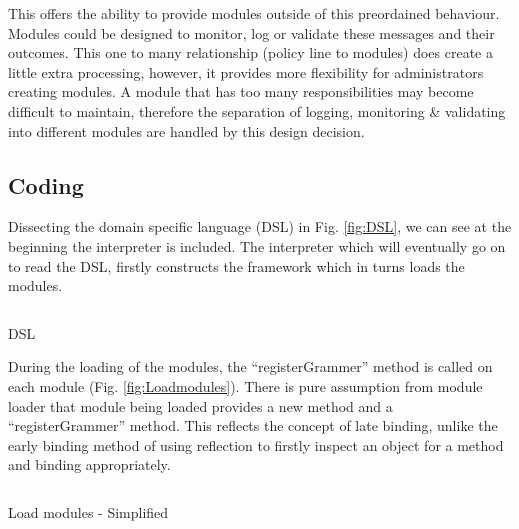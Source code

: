		\normalsize
		{			
			This offers the ability to provide modules outside of this preordained behaviour.  Modules could be designed to
			monitor, log or validate these messages and their outcomes.  This one to many relationship (policy line to modules) does create a 
			little extra processing, however, it provides more flexibility for administrators creating modules.  A module that has too many responsibilities
			may become difficult to maintain, therefore the separation of logging, monitoring \& validating into different modules are handled
			by this design decision.
			\newline
		}	
		
\newpage
	
	\subsection{Coding} 
	
		Dissecting the domain specific language (DSL) in Fig. \ref{fig:DSL},  we can see at the beginning the interpreter is included.  
		The interpreter which will eventually go on to read the DSL, firstly constructs the framework which in turns loads the modules.
		
		\vspace{4mm}
		\begin{figurehere}
			\inputminted[linenos=true,fontsize=\footnotesize,tabsize=2]{perl}{pages/chapter3/smippets/dsl}
			\vspace{-5mm}
			\caption{DSL}
			\label{fig:DSL}
		\end{figurehere}	
			
		\vspace{4mm}
		During the loading of the modules, the ``registerGrammer'' method is called on each module (Fig. \ref{fig:Loadmodules}).  
		There is pure assumption from module loader that module being loaded provides a new method and a ``registerGrammer'' method.
		This reflects the concept of late binding,  unlike the early binding method of using reflection to firstly inspect an object for a method
		and binding appropriately.
		
		\vspace{4mm}
		\begin{figurehere}
			\inputminted[linenos=true,fontsize=\footnotesize,tabsize=2]{perl}{pages/chapter3/smippets/loadmodules}
			\vspace{-5mm}
			\caption{Load modules - Simplified}
			\label{fig:Loadmodules}
		\end{figurehere}	
		
